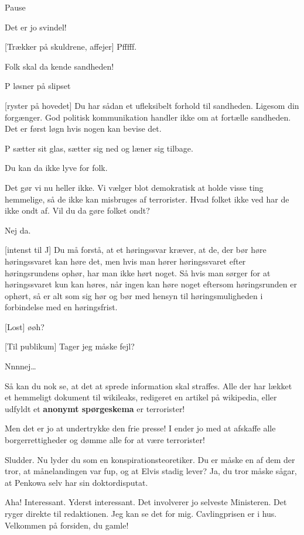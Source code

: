 \documentclass[a4paper,11pt]{article}
\begin{document}
\begin{sketch}
\scene Pause

Det er jo svindel!

[Trækker på skuldrene, affejer] Pfffff.

Folk skal da kende sandheden!

\scene P løsner på slipset

[ryster på hovedet] Du har sådan et ufleksibelt forhold til
sandheden. Ligesom din forgænger. God politisk kommunikation handler
ikke om at fortælle sandheden. Det er først løgn hvis nogen kan bevise
det.

\scene P sætter sit glas, sætter sig ned og læner sig tilbage.

Du kan da ikke lyve for folk.

Det gør vi nu heller ikke. Vi vælger blot demokratisk at holde
visse ting hemmelige, så de ikke kan misbruges af terrorister. Hvad
folket ikke ved har de ikke ondt af. Vil du da gøre folket ondt?

Nej da.

[intenst til J] Du må forstå, at et høringssvar kræver, at de,
der bør høre høringssvaret kan høre det, men hvis man hører
høringssvaret efter høringsrundens ophør, har man ikke hørt noget. Så
hvis man sørger for at høringssvaret kun kan høres, når ingen kan høre
noget eftersom høringsrunden er ophørt, så er alt som sig hør og bør
med hensyn til høringsmuligheden i forbindelse med en høringsfrist.

[Lost] øøh?

[Til publikum] Tager jeg måske fejl?

Nnnnej\ldots

Så kan du nok se, at det at sprede information skal
straffes. Alle der har lækket et hemmeligt dokument til wikileaks,
redigeret en artikel på wikipedia, eller udfyldt et \textbf{anonymt
  spørgeskema} er terrorister!

Men det er jo at undertrykke den frie presse! I ender jo med
at afskaffe alle borgerrettigheder og dømme alle for at være
terrorister!

Sludder. Nu lyder du som en konspirationsteoretiker. Du er
måske en af dem der tror, at månelandingen var fup, og at Elvis stadig
lever? Ja, du tror måske sågar, at Penkowa selv har sin
doktordisputat.

Aha! Interessant. 
Yderst interessant. Det involverer jo selveste Ministeren. Det ryger
direkte til redaktionen. Jeg kan se det for mig. Cavlingprisen er i
hus.  Velkommen på forsiden, du gamle!


\end{sketch}
\end{document}
